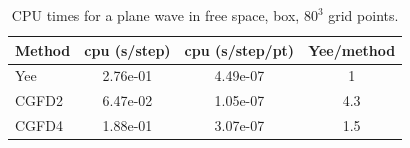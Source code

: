 \documentclass[11pt]{article}
\begin{document}
\begin{table}[hbt]
\begin{center}
\begin{tabular}{|l|c|c|c|}\hline
Method  & cpu (s/step) & cpu (s/step/pt) &  Yee/method   \\ \hline
Yee     &   2.76e-01   &   4.49e-07      &    1     \\
CGFD2   &   6.47e-02   &   1.05e-07      &    4.3    \\
CGFD4   &   1.88e-01   &   3.07e-07      &    1.5   \\ \hline
\end{tabular}
\end{center}
\caption{ CPU times for a plane wave in free space, box, $80^3$ grid points.}\label{tab:planeWaveCPU}
\end{table}
\end{document}
